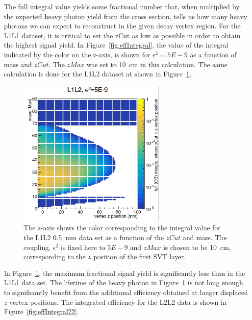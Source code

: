 The full integral value yields some fractional number that, when multiplied by the expected heavy photon yield from the cross section, tells us how many heavy photons we can expect to reconstruct in the given decay vertex region. For the L1L1 dataset, it is critical to set the zCut as low as possible in order to obtain the highest signal yield. In Figure~\ref{fig:effIntegral}, the value of the integral indicated by the color on the z-axis, is shown for $\epsilon^{2} = 5E-9$ as a function of mass and $zCut$. The $zMax$ was set to 10~cm in this calculation. The same calculation is done for the L1L2 dataset at shown in Figure~\ref{fig:effIntegral12}.

\begin{figure}[htb]
  \centering
      \includegraphics[width=0.65\textwidth]{pics/searching/integralEff12.png}
  \caption[Integral as a function of mass and $zCut$ for L1L2]{The z-axis shows the color corresponding to the integral value for the L1L2 0.5~mm data set as a function of the $zCut$ and mass. The coupling, $\epsilon^2$ is fixed here to $5E-9$ and $zMax$ is chosen to be 10~cm, corresponding to the $z$ position of the first SVT layer. }
  \label{fig:effIntegral12}
\end{figure}

In Figure~\ref{fig:effIntegral12}, the maximum fractional signal yield is significantly less than in the L1L1 data set. The lifetime of the heavy photon in Figure~\ref{fig:effIntegral12} is not long enough to significantly benefit from the additional efficiency obtained at longer displaced $z$ vertex positions. The integrated efficiency for the L2L2 data is shown in Figure~\ref{fig:effIntegral22}.

